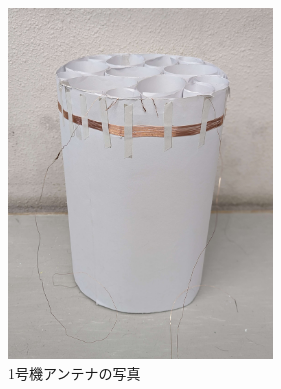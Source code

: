 \documentclass[report.tex]{subfiles}
\begin{document}
\begin{figure}[H]
	\centering
	\includegraphics[width=7cm]{fig/1.jpg}
	\caption{1号機アンテナの写真}
	\label{fig:1}
\end{figure}
\end{document}
